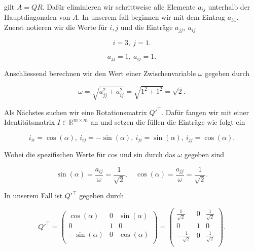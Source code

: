 gilt \( A = QR \). Dafür eliminieren wir schrittweise alle Elemente \( a_{ij} \) unterhalb der Hauptdiagonalen von \( A \). In unserem fall beginnen wir mit dem Eintrag \( a_{31} \). Zuerst notieren wir die Werte für \( i, j \) und die Einträge \( a_{jj}, \ a_{ij} \) 

\begin{equation*}
    i = 3, \ j = 1. 
\end{equation*}

\begin{equation*}
    a_{jj} = 1, \ a_{ij} = 1.
\end{equation*}

Anschliessend berechnen wir den Wert einer Zwischenvariable \( \omega \) gegeben durch

\begin{equation*}
    \omega = \sqrt{a_{jj}^2 + a_{ij}^2} = \sqrt{1^2 + 1^2} = \sqrt{2}.
\end{equation*}

Als Nächstes suchen wir eine Rotationsmatrix \( Q'^\top \). Dafür fangen wir mit einer Identitätsmatrix \( I \in \mathbb{R}^{m \times m} \) an und setzen die füllen die Einträge wie folgt ein

\begin{equation*}
    i_{ii} = \cos(\alpha), \ i_{ij} = -\sin(\alpha), \ i_{ji} = \sin(\alpha), \ i_{jj} = \cos(\alpha).
\end{equation*}

Wobei die spezifischen Werte für cos und sin durch das \( \omega \) gegeben sind

\begin{equation*}
    \sin(\alpha) = \frac{a_{ij}}{\omega} = \frac{1}{\sqrt{2}}, \quad \cos(\alpha) = \frac{a_{jj}}{\omega} = \frac{1}{\sqrt{2}}.
\end{equation*}

In unserem Fall ist \( Q'^\top \) gegeben durch

\begin{equation*}
    Q'^\top = \begin{pmatrix}
        \cos(\alpha) & 0 & \sin(\alpha) \\
        0 & 1 & 0 \\
        - \sin(\alpha) & 0 & \cos(\alpha) \\
    \end{pmatrix} =
    \begin{pmatrix}
        \frac{1}{\sqrt{2}} & 0 & \frac{1}{\sqrt{2}} \\
        0 & 1 & 0 \\
        -\frac{1}{\sqrt{2}} & 0 & \frac{1}{\sqrt{2}} \\
    \end{pmatrix}.
\end{equation*}

